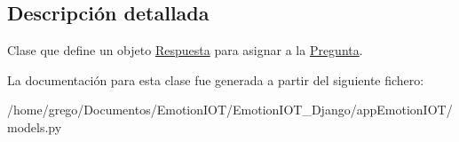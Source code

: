 \subsection{Descripción detallada}
Clase que define un objeto \hyperlink{classappEmotionIOT_1_1models_1_1Respuesta}{Respuesta} para asignar a la \hyperlink{classappEmotionIOT_1_1models_1_1Pregunta}{Pregunta}. 

La documentación para esta clase fue generada a partir del siguiente fichero\+:\begin{DoxyCompactItemize}
\item 
/home/grego/\+Documentos/\+Emotion\+I\+O\+T/\+Emotion\+I\+O\+T\+\_\+\+Django/app\+Emotion\+I\+O\+T/models.\+py\end{DoxyCompactItemize}
